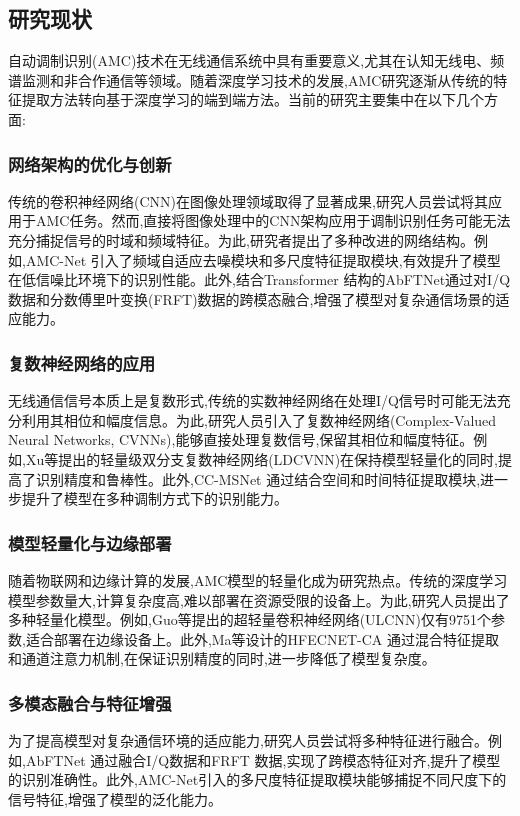 \documentclass{article}
\begin{document}
\begin{CJK}{UTF8}{gbsn}
\subsection{研究现状}
自动调制识别(AMC)技术在无线通信系统中具有重要意义,尤其在认知无线电、频谱监测和非合作通信等领域。随着深度学习技术的发展,AMC研究逐渐从传统的特征提取方法转向基于深度学习的端到端方法。当前的研究主要集中在以下几个方面:

\subsubsection{网络架构的优化与创新}
传统的卷积神经网络(CNN)在图像处理领域取得了显著成果,研究人员尝试将其应用于AMC任务。然而,直接将图像处理中的CNN架构应用于调制识别任务可能无法充分捕捉信号的时域和频域特征。为此,研究者提出了多种改进的网络结构。例如,AMC-Net 引入了频域自适应去噪模块和多尺度特征提取模块,有效提升了模型在低信噪比环境下的识别性能。此外,结合Transformer 结构的AbFTNet通过对I/Q数据和分数傅里叶变换(FRFT)数据的跨模态融合,增强了模型对复杂通信场景的适应能力。

\subsubsection{复数神经网络的应用}
无线通信信号本质上是复数形式,传统的实数神经网络在处理I/Q信号时可能无法充分利用其相位和幅度信息。为此,研究人员引入了复数神经网络(Complex-Valued Neural Networks, CVNNs),能够直接处理复数信号,保留其相位和幅度特征。例如,Xu等提出的轻量级双分支复数神经网络(LDCVNN)在保持模型轻量化的同时,提高了识别精度和鲁棒性。此外,CC-MSNet 通过结合空间和时间特征提取模块,进一步提升了模型在多种调制方式下的识别能力。

\subsubsection{模型轻量化与边缘部署}
随着物联网和边缘计算的发展,AMC模型的轻量化成为研究热点。传统的深度学习模型参数量大,计算复杂度高,难以部署在资源受限的设备上。为此,研究人员提出了多种轻量化模型。例如,Guo等提出的超轻量卷积神经网络(ULCNN)仅有9751个参数,适合部署在边缘设备上。此外,Ma等设计的HFECNET-CA 通过混合特征提取和通道注意力机制,在保证识别精度的同时,进一步降低了模型复杂度。

\subsubsection{多模态融合与特征增强}
为了提高模型对复杂通信环境的适应能力,研究人员尝试将多种特征进行融合。例如,AbFTNet 通过融合I/Q数据和FRFT 数据,实现了跨模态特征对齐,提升了模型的识别准确性。此外,AMC-Net引入的多尺度特征提取模块能够捕捉不同尺度下的信号特征,增强了模型的泛化能力。


\end{CJK}
\end{document}
